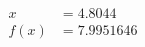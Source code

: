\documentclass[preview]{standalone}
\begin{document}
\begin{align*}
x &= 4.8044\\f(x) &= 7.9951646
\end{align*}
\end{document}
